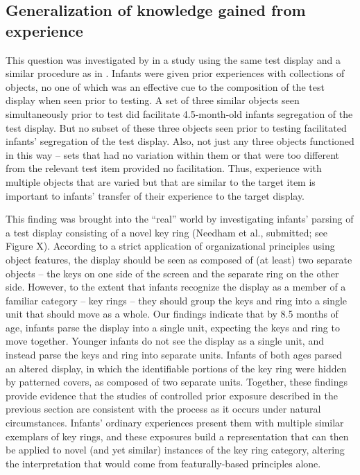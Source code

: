 \subsection{Generalization of knowledge gained from experience}

This question was investigated by 
in a study using the same test display and a similar procedure as in
.  Infants were given prior experiences with collections
of objects, no one of which was an effective cue to the composition of
the test display when seen prior to testing.  A set of three similar
objects seen simultaneously prior to test did facilitate 4.5-month-old
infants segregation of the test display.  But no subset of these three
objects seen prior to testing facilitated infants' segregation of the
test display.  Also, not just any three objects functioned in this way
-- sets that had no variation within them or that were too different
from the relevant test item provided no facilitation.  Thus,
experience with multiple objects that are varied but that are similar
to the target item is important to infants' transfer of their
experience to the target display.



This finding was brought into the ``real'' world by investigating
infants' parsing of a test display consisting of a novel key
ring (Needham et al., submitted; see Figure X).  According to a strict
application of organizational principles using object features, the
display should be seen as composed of (at least) two separate
objects -- the keys on one side of the screen and the separate
ring on the other side.  However, to the extent that infants recognize
the display as a member of a familiar category -- key
rings -- they should group the keys and ring into a single unit
that should move as a whole.  Our findings indicate that by 8.5 months
of age, infants parse the display into a single unit, expecting the
keys and ring to move together.  Younger infants do not see the
display as a single unit, and instead parse the keys and ring into
separate units.  Infants of both ages parsed an altered display, in
which the identifiable portions of the key ring were hidden by
patterned covers, as composed of two separate units.  Together, these
findings provide evidence that the studies of controlled prior
exposure described in the previous section are consistent with the
process as it occurs under natural circumstances.  Infants'
ordinary experiences present them with multiple similar exemplars of
key rings, and these exposures build a representation that can then be
applied to novel (and yet similar) instances of the key ring category,
altering the interpretation that would come from featurally-based
principles alone.




